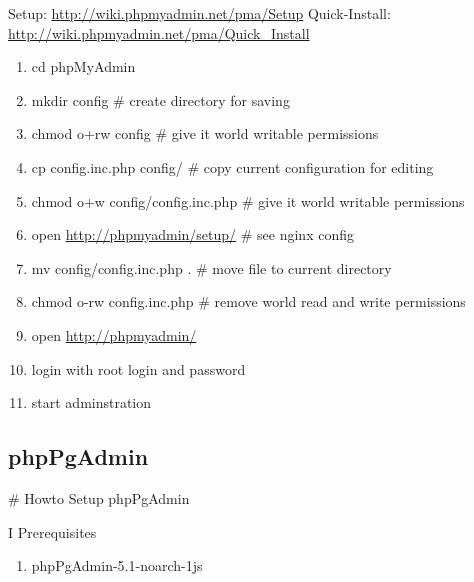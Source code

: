 \documentclass[letterpaper,10pt,english]{sphinxmanual}
\begin{document}
Setup: \href{http://wiki.phpmyadmin.net/pma/Setup}{http://wiki.phpmyadmin.net/pma/Setup}
Quick-Install: \href{http://wiki.phpmyadmin.net/pma/Quick\_Install}{http://wiki.phpmyadmin.net/pma/Quick\_Install}
\begin{enumerate}
\item {} 
cd phpMyAdmin

\item {} 
mkdir config                        \# create directory for saving

\item {} 
chmod o+rw config                   \# give it world writable permissions

\item {} 
cp config.inc.php config/           \# copy current configuration for editing

\item {} 
chmod o+w config/config.inc.php     \# give it world writable permissions

\item {} 
open \href{http://phpmyadmin/setup/}{http://phpmyadmin/setup/}       \# see nginx config

\item {} 
mv config/config.inc.php .          \# move file to current directory

\item {} 
chmod o-rw config.inc.php           \# remove world read and write permissions

\item {} 
open \href{http://phpmyadmin/}{http://phpmyadmin/}

\item {} 
login with root login and password

\item {} 
start adminstration

\end{enumerate}


\subsection{phpPgAdmin}
\label{sdocs/databases/phpPgAdmin/phpPgAdmin::doc}\label{sdocs/databases/phpPgAdmin/phpPgAdmin:phppgadmin}
\# Howto Setup phpPgAdmin

I Prerequisites
\begin{enumerate}
\item {} 
phpPgAdmin-5.1-noarch-1js

\end{enumerate}
\end{document}

